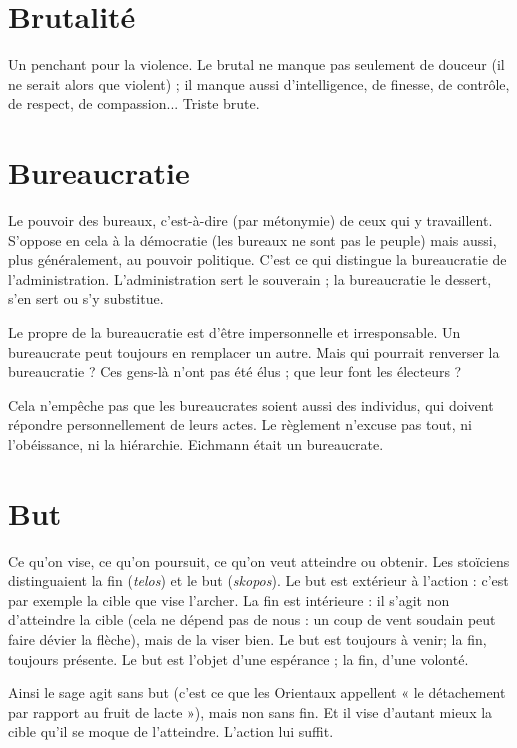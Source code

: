 \section{Brutalité}
Un penchant pour la violence. Le brutal ne manque pas seulement
de douceur (il ne serait alors que violent) ; il manque
aussi d'intelligence, de finesse, de contrôle, de respect, de compassion... Triste
brute.

\section{Bureaucratie}
Le pouvoir des bureaux, c’est-à-dire (par métonymie) de
ceux qui y travaillent. S’oppose en cela à la démocratie
(les bureaux ne sont pas le peuple) mais aussi, plus généralement, au pouvoir
politique. C’est ce qui distingue la bureaucratie de l'administration. L’administration
sert le souverain ; la bureaucratie le dessert, s’en sert ou s’y substitue.

Le propre de la bureaucratie est d’être impersonnelle et irresponsable. Un
bureaucrate peut toujours en remplacer un autre. Mais qui pourrait renverser la
bureaucratie ? Ces gens-là n’ont pas été élus ; que leur font les électeurs ?

Cela n'empêche pas que les bureaucrates soient aussi des individus, qui doivent
répondre personnellement de leurs actes. Le règlement n’excuse pas tout,
ni l’obéissance, ni la hiérarchie. Eichmann était un bureaucrate.

\section{But}
Ce qu'on vise, ce qu’on poursuit, ce qu’on veut atteindre ou obtenir.
Les stoïciens distinguaient la fin ({\it telos}) et le but ({\it skopos}). Le but est
extérieur à l’action : c’est par exemple la cible que vise l’archer. La fin est
intérieure : il s’agit non d’atteindre la cible (cela ne dépend pas de nous : un
coup de vent soudain peut faire dévier la flèche), mais de la viser bien. Le but
est toujours à venir; la fin, toujours présente. Le but est l’objet d’une
espérance ; la fin, d’une volonté.

Ainsi le sage agit sans but (c’est ce que les Orientaux appellent « le détachement
par rapport au fruit de lacte »), mais non sans fin. Et il vise d’autant
mieux la cible qu’il se moque de l'atteindre. L'action lui suffit.

